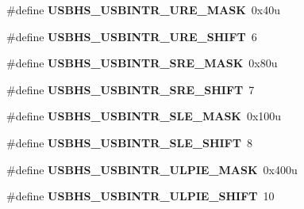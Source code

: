 \begin{DoxyCompactItemize}
\item 
\hypertarget{group___u_s_b_h_s___register___masks_ga67f1ee277cdfc8758a020e06319a8eff}{}\#define {\bfseries U\+S\+B\+H\+S\+\_\+\+U\+S\+B\+I\+N\+T\+R\+\_\+\+U\+R\+E\+\_\+\+M\+A\+S\+K}~0x40u\label{group___u_s_b_h_s___register___masks_ga67f1ee277cdfc8758a020e06319a8eff}

\item 
\hypertarget{group___u_s_b_h_s___register___masks_ga8cb1afb3f22ba49885a16aaa066f84c0}{}\#define {\bfseries U\+S\+B\+H\+S\+\_\+\+U\+S\+B\+I\+N\+T\+R\+\_\+\+U\+R\+E\+\_\+\+S\+H\+I\+F\+T}~6\label{group___u_s_b_h_s___register___masks_ga8cb1afb3f22ba49885a16aaa066f84c0}

\item 
\hypertarget{group___u_s_b_h_s___register___masks_ga9d67afee04377507b21a87ad7bf65e74}{}\#define {\bfseries U\+S\+B\+H\+S\+\_\+\+U\+S\+B\+I\+N\+T\+R\+\_\+\+S\+R\+E\+\_\+\+M\+A\+S\+K}~0x80u\label{group___u_s_b_h_s___register___masks_ga9d67afee04377507b21a87ad7bf65e74}

\item 
\hypertarget{group___u_s_b_h_s___register___masks_ga0b841888c75ef911eaa666912ea9cc65}{}\#define {\bfseries U\+S\+B\+H\+S\+\_\+\+U\+S\+B\+I\+N\+T\+R\+\_\+\+S\+R\+E\+\_\+\+S\+H\+I\+F\+T}~7\label{group___u_s_b_h_s___register___masks_ga0b841888c75ef911eaa666912ea9cc65}

\item 
\hypertarget{group___u_s_b_h_s___register___masks_gac83bb3ac208d4ffcae8f1ee11c3a7057}{}\#define {\bfseries U\+S\+B\+H\+S\+\_\+\+U\+S\+B\+I\+N\+T\+R\+\_\+\+S\+L\+E\+\_\+\+M\+A\+S\+K}~0x100u\label{group___u_s_b_h_s___register___masks_gac83bb3ac208d4ffcae8f1ee11c3a7057}

\item 
\hypertarget{group___u_s_b_h_s___register___masks_ga0096cb7e6b5389c4f439f47c364037ae}{}\#define {\bfseries U\+S\+B\+H\+S\+\_\+\+U\+S\+B\+I\+N\+T\+R\+\_\+\+S\+L\+E\+\_\+\+S\+H\+I\+F\+T}~8\label{group___u_s_b_h_s___register___masks_ga0096cb7e6b5389c4f439f47c364037ae}

\item 
\hypertarget{group___u_s_b_h_s___register___masks_ga84b0eb20585e57d1f3d924a67d63c8ee}{}\#define {\bfseries U\+S\+B\+H\+S\+\_\+\+U\+S\+B\+I\+N\+T\+R\+\_\+\+U\+L\+P\+I\+E\+\_\+\+M\+A\+S\+K}~0x400u\label{group___u_s_b_h_s___register___masks_ga84b0eb20585e57d1f3d924a67d63c8ee}

\item 
\hypertarget{group___u_s_b_h_s___register___masks_gae741e21c6f6fd154faa3bf8fbf00e544}{}\#define {\bfseries U\+S\+B\+H\+S\+\_\+\+U\+S\+B\+I\+N\+T\+R\+\_\+\+U\+L\+P\+I\+E\+\_\+\+S\+H\+I\+F\+T}~10\label{group___u_s_b_h_s___register___masks_gae741e21c6f6fd154faa3bf8fbf00e544}


\end{DoxyCompactItemize}
